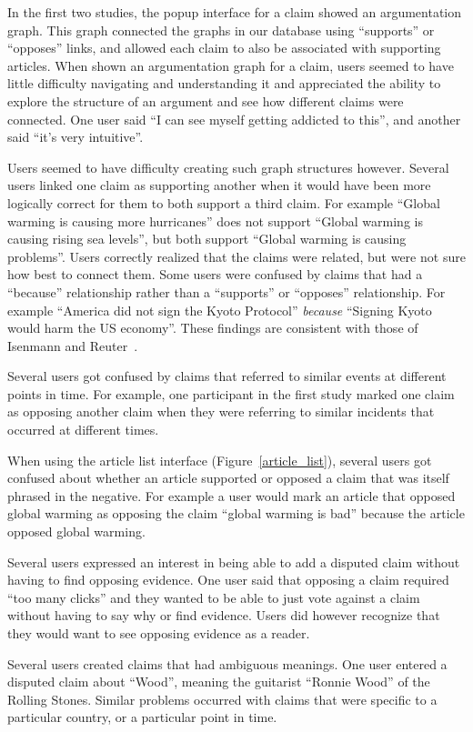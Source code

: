 \documentclass{www2010-submission}
\begin{document}
In the first two studies, the popup interface for a claim showed an argumentation graph. This graph connected the graphs in our database using ``supports'' or ``opposes'' links, and allowed each claim to also be associated with supporting articles. When shown an argumentation graph for a claim, users seemed to have little difficulty navigating and understanding it and appreciated the ability to explore the structure of an argument and see how different claims were connected. One user said ``I can see myself getting addicted to this'', and another said ``it's very intuitive''.

Users seemed to have difficulty creating such graph structures however. Several users linked one claim as supporting another when it would have been more logically correct for them to both support a third claim. For example ``Global warming is causing more hurricanes'' does not support ``Global warming is causing rising sea levels'', but both support ``Global warming is causing problems''. Users correctly realized that the claims were related, but were not sure how best to connect them. Some users were confused by claims that had a ``because'' relationship rather than a ``supports'' or ``opposes'' relationship. For example ``America did not sign the Kyoto Protocol'' {\it because} ``Signing Kyoto would harm the US economy''. These findings are consistent with those of Isenmann and Reuter~\cite{Isenmann1997}.

Several users got confused by claims that referred to similar events at different points in time. For example, one participant in the first study marked one claim as opposing another claim when they were referring to similar incidents that occurred at different times. 

When using the article list interface (Figure~\ref{article_list}), several users got confused about whether an article supported or opposed a claim that was itself phrased in the negative. For example a user would mark an article that opposed global warming as opposing the claim ``global warming is bad'' because the article opposed global warming.

Several users expressed an interest in being able to add a disputed claim without having to find opposing evidence. One user said that opposing a claim required ``too many clicks'' and they wanted to be able to just vote against a claim without having to say why or find evidence. Users did however recognize that they would want to see opposing evidence as a reader.

Several users created claims that had ambiguous meanings. One user entered a disputed claim about ``Wood'', meaning the guitarist ``Ronnie Wood'' of the Rolling Stones. Similar problems occurred with claims that were specific to a particular country, or a particular point in time. 
\end{document}

